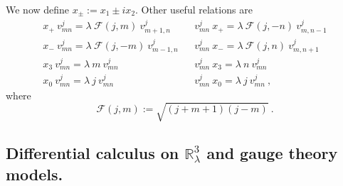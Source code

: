 \documentclass[a4paper,11pt,twoside]{article}
\numberwithin{equation}{section}
\theoremstyle{nonumberplain}
\newcounter{and}
\begin{document}
%
We now define $x_\pm := x_1\pm i x_2$. Other useful relations \cite{vit-wal-12} are%
%
\begin{eqnarray}
x_+ \ v^j_{mn} = \lambda \ \mathcal{F}(j,m) \ v^j_{m+1, n}  
&& v^j_{mn} \ x_+ = \lambda \ \mathcal{F}(j,-n) \ v^j_{m, n -1} \nonumber \\
x_- \ v^j_{mn} = \lambda \ \mathcal{F}(j,-m) \ v^j_{m-1,n}  
&& v^j_{mn} \ x_- = \lambda \ \mathcal{F}(j,n) \ v^j_{m,n +1} \nonumber \\
x_3 \ v^j_{mn} = \lambda \ m \ v^j_{mn}
&& v^j_{mn} \ x_3 = \lambda \ n \ v^j_{mn} \nonumber \\
x_0 \ v^j_{mn} = \lambda \ j \ v^j_{mn}
&& v^j_{mn} \ x_0 = \lambda \ j \ v^j_{mn} \ , \label{x0-commut}
\end{eqnarray}
%
where%
%
\begin{equation}
\mathcal{F}(j,m):=\sqrt{(j+m+1)(j-m)} \ . \label{fjm}
\end{equation}


\subsection{\texorpdfstring{Differential calculus on $\mathbb{R}^3_\lambda$ and gauge theory models.}{Family of gauge theories}} \label{subsection22}
\end{document}
